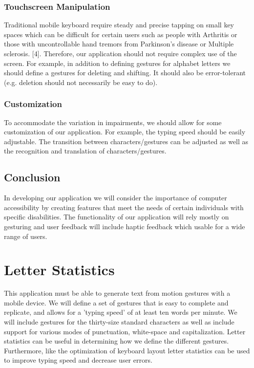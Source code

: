 \documentclass[onecolumn, draftclsnofoot,10pt, journal, letterpaper]{IEEEtran}
\begin{document}
\subsubsection{Touchscreen Manipulation}
Traditional mobile keyboard require steady and precise tapping on small key spaces which can be difficult for certain users such as people with Arthritis or those with uncontrollable hand tremors from Parkinson's disease or Multiple sclerosis. [4]. Therefore, our application should not require complex use of the screen. For example, in addition to defining gestures for alphabet letters we should define a gestures for deleting and shifting. It should also be error-tolerant (e.g. deletion should not necessarily be easy to do).
\subsubsection{Customization}
To accommodate the variation in impairments, we should allow for some customization of our application. For example, the typing speed should be easily adjustable. The transition between characters/gestures can be adjusted as well as the recognition and translation of characters/gestures.
\subsection{Conclusion}
In developing our application we will consider the importance of computer accessibility by creating features that meet the needs of certain individuals with specific disabilities. The functionality of our application will rely mostly on gesturing and user feedback will include haptic feedback which usable for a wide range of users. 

\section{Letter Statistics}
This application must be able to generate text from motion gestures with a mobile device. We will define a set of gestures that is easy to complete and replicate, and allows for a 'typing speed' of at least ten words per minute. We will include gestures for the thirty-size standard characters as well as include support for various modes of punctuation, white-space and capitalization. Letter statistics can be useful in determining how we define the different gestures. Furthermore, like the optimization of keyboard layout letter statistics can be used to improve typing speed and decrease user errors.
\end{document}
